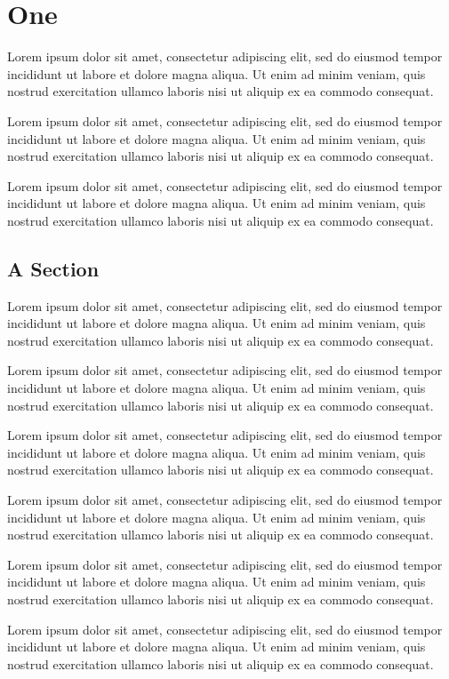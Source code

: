 \documentclass[oneside,12pt]{book}
\begin{document}
\chapter{One}
Lorem ipsum dolor sit amet, consectetur adipiscing elit, sed do eiusmod tempor incididunt ut labore et dolore magna aliqua. Ut enim ad minim veniam, quis nostrud exercitation ullamco laboris nisi ut aliquip ex ea commodo consequat.

Lorem ipsum dolor sit amet, consectetur adipiscing elit, sed do eiusmod tempor incididunt ut labore et dolore magna aliqua. Ut enim ad minim veniam, quis nostrud exercitation ullamco laboris nisi ut aliquip ex ea commodo consequat.

Lorem ipsum dolor sit amet, consectetur adipiscing elit, sed do eiusmod tempor incididunt ut labore et dolore magna aliqua. Ut enim ad minim veniam, quis nostrud exercitation ullamco laboris nisi ut aliquip ex ea commodo consequat.

\section{A Section}
Lorem ipsum dolor sit amet, consectetur adipiscing elit, sed do eiusmod tempor incididunt ut labore et dolore magna aliqua. Ut enim ad minim veniam, quis nostrud exercitation ullamco laboris nisi ut aliquip ex ea commodo consequat.

Lorem ipsum dolor sit amet, consectetur adipiscing elit, sed do eiusmod tempor incididunt ut labore et dolore magna aliqua. Ut enim ad minim veniam, quis nostrud exercitation ullamco laboris nisi ut aliquip ex ea commodo consequat.

Lorem ipsum dolor sit amet, consectetur adipiscing elit, sed do eiusmod tempor incididunt ut labore et dolore magna aliqua. Ut enim ad minim veniam, quis nostrud exercitation ullamco laboris nisi ut aliquip ex ea commodo consequat.

Lorem ipsum dolor sit amet, consectetur adipiscing elit, sed do eiusmod tempor incididunt ut labore et dolore magna aliqua. Ut enim ad minim veniam, quis nostrud exercitation ullamco laboris nisi ut aliquip ex ea commodo consequat.

Lorem ipsum dolor sit amet, consectetur adipiscing elit, sed do eiusmod tempor incididunt ut labore et dolore magna aliqua. Ut enim ad minim veniam, quis nostrud exercitation ullamco laboris nisi ut aliquip ex ea commodo consequat.

Lorem ipsum dolor sit amet, consectetur adipiscing elit, sed do eiusmod tempor incididunt ut labore et dolore magna aliqua. Ut enim ad minim veniam, quis nostrud exercitation ullamco laboris nisi ut aliquip ex ea commodo consequat.
\end{document}
